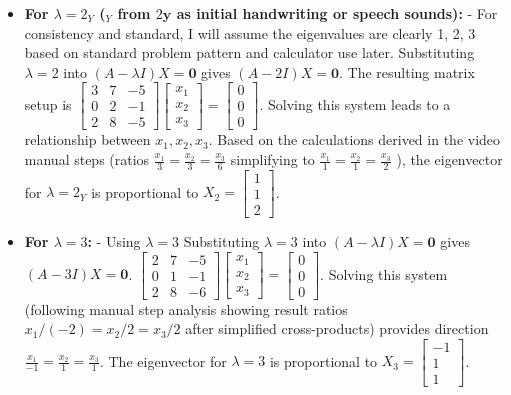 \documentclass{article}
\begin{document}
\begin{itemize}
        \item \textbf{For $\lambda = 2_Y$ ($_{Y}$ from $2\textbf{y}$ as initial handwriting or speech sounds):} - For consistency and standard, I will assume the eigenvalues are clearly 1, 2, 3 based on standard problem pattern and calculator use later.
        Substituting $\lambda=2$ into $(A - \lambda I)X = \mathbf{0}$ gives $(A - 2I)X = \mathbf{0}$.
        The resulting matrix setup is $\begin{bmatrix} 3 & 7 & -5 \\ 0 & 2 & -1 \\ 2 & 8 & -5 \end{bmatrix} \begin{bmatrix} x_1 \\ x_2 \\ x_3 \end{bmatrix} = \begin{bmatrix} 0 \\ 0 \\ 0 \end{bmatrix}$.
        Solving this system leads to a relationship between $x_1, x_2, x_3$. Based on the calculations derived in the video manual steps (ratios $\frac{x_1}{3}=\frac{x_2}{3}=\frac{x_3}{6}$ simplifying to $\frac{x_1}{1}=\frac{x_2}{1}=\frac{x_3}{2}$ ), the eigenvector for $\lambda = 2_Y$ is proportional to $X_2 = \begin{bmatrix} 1 \\ 1 \\ 2 \end{bmatrix}$.

        \item \textbf{For $\lambda = 3$:} - Using $\lambda = 3$
        Substituting $\lambda=3$ into $(A - \lambda I)X = \mathbf{0}$ gives $(A - 3I)X = \mathbf{0}$.
        $\begin{bmatrix} 2 & 7 & -5 \\ 0 & 1 & -1 \\ 2 & 8 & -6 \end{bmatrix} \begin{bmatrix} x_1 \\ x_2 \\ x_3 \end{bmatrix} = \begin{bmatrix} 0 \\ 0 \\ 0 \end{bmatrix}$.
        Solving this system (following manual step analysis showing result ratios $x_1/(-2) = x_2/2 = x_3/2$ after simplified cross-products) provides direction $\frac{x_1}{-1}=\frac{x_2}{1}=\frac{x_3}{1}$. The eigenvector for $\lambda = 3$ is proportional to $X_3 = \begin{bmatrix} -1 \\ 1 \\ 1 \end{bmatrix}$.

    \end{itemize}
\end{document}
